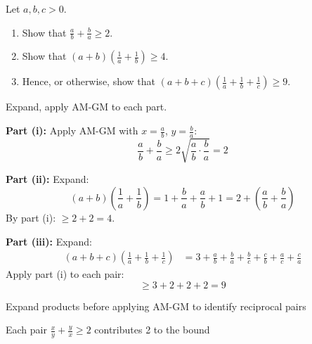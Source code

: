 \begin{problem}
Let $a, b, c > 0$.
\begin{enumerate}
    \item[(i)] Show that $\frac{a}{b} + \frac{b}{a} \ge 2$.
    \item[(ii)] Show that $(a+b)\left(\frac{1}{a} + \frac{1}{b}\right) \ge 4$.
    \item[(iii)] Hence, or otherwise, show that $(a+b+c)\left(\frac{1}{a} + \frac{1}{b} + \frac{1}{c}\right) \ge 9$.
\end{enumerate}
\end{problem}

\begin{hint}
Expand, apply AM-GM to each part.
\end{hint}

\begin{solution}
\textbf{Part (i):} Apply AM-GM with $x = \frac{a}{b}$, $y = \frac{b}{a}$:
\[ \frac{a}{b} + \frac{b}{a} \geq 2\sqrt{\frac{a}{b} \cdot \frac{b}{a}} = 2 \]

\textbf{Part (ii):} Expand:
\[ (a+b)\left(\frac{1}{a} + \frac{1}{b}\right) = 1 + \frac{b}{a} + \frac{a}{b} + 1 = 2 + \left(\frac{a}{b} + \frac{b}{a}\right) \]
By part (i): $\geq 2 + 2 = 4$.

\textbf{Part (iii):} Expand:
\begin{align*}
(a+b+c)\left(\frac{1}{a} + \frac{1}{b} + \frac{1}{c}\right) &= 3 + \frac{a}{b} + \frac{b}{a} + \frac{b}{c} + \frac{c}{b} + \frac{a}{c} + \frac{c}{a}
\end{align*}
Apply part (i) to each pair:
\[ \geq 3 + 2 + 2 + 2 = 9 \]
\end{solution}

\begin{takeaways}
\item Expand products before applying AM-GM to identify reciprocal pairs
\item Each pair $\frac{x}{y} + \frac{y}{x} \geq 2$ contributes 2 to the bound
\end{takeaways}
